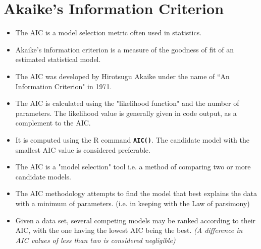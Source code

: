\documentclass[a4paper,12pt]{article}
\begin{document}
\section*{Akaike's Information Criterion}

\begin{itemize}
\item The AIC is a model selection metric often used in statistics. 
\item Akaike's information criterion is a measure of the goodness of fit of an estimated statistical model.

\item The AIC was developed by Hirotsugu Akaike under the name of ``An Information Criterion" in 1971.

\item The AIC is calculated using the "likelihood function" and the number of parameters. The likelihood value is generally given in code output, as a complement to the AIC.

\item It is computed using the R command
\texttt{\textbf{AIC()}}. The candidate model with the smallest AIC value is considered preferable.

\item The AIC is a "model selection" tool i.e. a method of comparing two 
or more candidate models.
\item The AIC methodology attempts to find the model that best explains the data with a minimum of parameters.
(i.e. in keeping with the Law of parsimony)

\item Given a data set, several competing models may be ranked according to their AIC, with the one having the lowest AIC being the best. \textit{(A difference in AIC values of less than two is considered negligible)}
\end{itemize}
\end{document}
